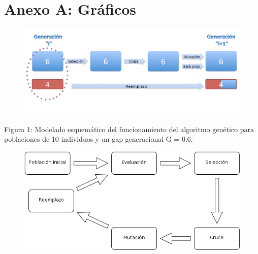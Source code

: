 \documentclass[%
    final,
    reprint,
    notitlepage,
    narroweqnarray,
    inline,
    twoside,
    invited
    ]{ieee}
\begin{document}


\clearpage
\onecolumn

\section*{Anexo A: Gráficos}

\begin{figure}[H]
\begin{center}
\includegraphics[scale=1.90]{./images/AlgGenModelado.png}
\label{modelado}
\end{center}
\end{figure}

\begin{center}
\par Figura 1: Modelado esquemático del funcionamiento del algoritmo genético para poblaciones de 10 individuos y un gap generacional G = 0.6.
\end{center}

\begin{figure}[H]
\begin{center}
\includegraphics[scale=0.80]{./images/Dibujo1.png}
\label{modelado}
\end{center}
\end{figure}

\end{document}

